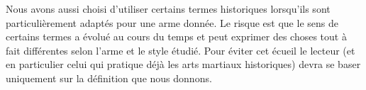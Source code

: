 Nous avons aussi choisi d'utiliser certains termes historiques lorsqu'ils sont particulièrement adaptés pour une arme donnée.
Le risque est que le sens de certains termes a évolué au cours du temps et peut exprimer des choses tout à fait différentes selon l'arme et le style étudié.
Pour éviter cet écueil le lecteur (et en particulier celui qui pratique déjà les arts martiaux historiques) devra se baser uniquement sur la définition que nous donnons.

